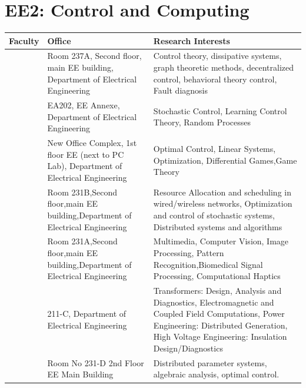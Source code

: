\documentclass[openany]{book} %
\begin{document}
\section{EE2: Control and Computing}
\begin{tabular}{p{3.5cm} p{3.5cm}p{9cm}}
\hline 
\hline  
Faculty  & Office  & Research Interests \\ 
\hline 
\href{https://www.ee.iitb.ac.in/wiki/faculty/belur}{\color{blue}{Prof. Madhu N. Belur}} & Room 237A, Second floor, main EE building, Department of Electrical Engineering & Control theory, dissipative systems, graph theoretic methods, decentralized control, behavioral theory control, Fault diagnosis \\
\hline 
\href{https://www.ee.iitb.ac.in/web/faculty/homepage/borkar}{\color{blue}{Prof. Vivek Shripad Borkar }}& EA202, EE Annexe, Department of Electrical Engineering & Stochastic Control, Learning Control Theory, Random Processes \\ 
\hline 
\href{https://www.ee.iitb.ac.in/wiki/faculty/dc}{\color{blue}{Prof. Debraj Chakraborty }}& New Office Complex, 1st floor EE (next to PC Lab), Department of Electrical Engineering & Optimal Control, Linear Systems, Optimization, Differential Games,Game Theory \\ 
\hline 
\href{https://www.ee.iitb.ac.in/wiki/faculty/chaporkar}{\color{blue}{Prof. Prasanna Chaporkar }}& Room 231B,Second floor,main EE building,Department of Electrical Engineering & Resource Allocation and scheduling in wired/wireless networks, Optimization and control of stochastic systems, Distributed systems and algorithms \\ 
\hline 
\href{https://www.ee.iitb.ac.in/~sc/}{\color{blue}{Prof. Subhasis Chaudhuri }}& Room 231A,Second floor,main EE building,Department of Electrical Engineering & Multimedia, Computer Vision, Image Processing, Pattern Recognition,Biomedical Signal Processing, Computational Haptics \\ 
\hline 
\href{https://www.ee.iitb.ac.in/wiki/faculty/svk}{\color{blue}{Prof. Shrikrishna V. Kulkarni}} & 211-C, Department of Electrical Engineering & Transformers: Design, Analysis and Diagnostics, Electromagnetic and Coupled Field Computations, Power Engineering: Distributed Generation, High Voltage Engineering: Insulation Design/Diagnostics \\ 
\hline 
\href{https://www.ee.iitb.ac.in/~debasattam/}{\color{blue}{Prof. Debasattam Pal}} & Room No 231-D 2nd Floor EE Main Building & Distributed parameter systems, algebraic analysis, optimal control. \\ 

\end{tabular}
\end{document}
